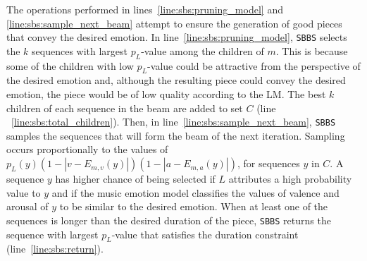 The operations performed in lines~\ref{line:sbs:pruning_model} and \ref{line:sbs:sample_next_beam} attempt to ensure the generation of good pieces that convey the desired emotion. In line~\ref{line:sbs:pruning_model}, \texttt{SBBS} selects the $k$ sequences with largest $p_L$-value among the children of $m$. This is because some of the children with low $p_L$-value could be attractive from the perspective of the desired emotion and,
although the resulting piece could convey the desired emotion, the piece would be of low quality according to the LM. The best $k$ children of each sequence in the beam are added to set $C$ (line
~\ref{line:sbs:total_children}). Then, in line~\ref{line:sbs:sample_next_beam}, \texttt{SBBS} samples the sequences that will form the beam of the next iteration. Sampling occurs proportionally to the values of $p_L(y) (1 - |v - E_{m,v}(y)|) (1 - |a - E_{m,a}(y)|)$, for sequences $y$ in $C$. A sequence $y$ has higher chance of being selected if $L$ attributes a high probability value to $y$ and if the music emotion model classifies the values of valence and arousal of $y$ to be similar to the desired emotion.
When at least one of the sequences is longer than the desired duration of the piece, \texttt{SBBS} returns the sequence with largest $p_L$-value that satisfies the duration constraint (line~\ref{line:sbs:return}).




